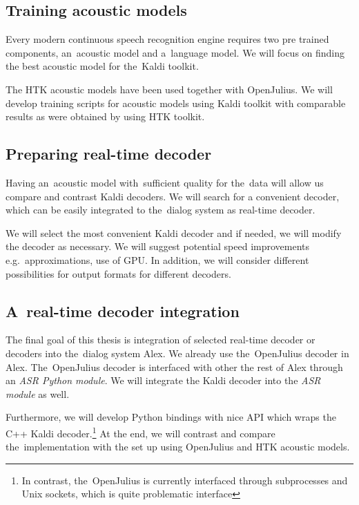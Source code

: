 \subsection{Training acoustic models} 
\label{sub:training_kaldi_acoustic_models}
Every modern continuous speech recognition engine requires two pre trained components, an~acoustic model and 
a~language model. We will focus on finding the best acoustic model for the~Kaldi toolkit. 

The \ac{HTK} acoustic models have been used together with OpenJulius. 
We will develop training scripts for acoustic models using Kaldi toolkit with comparable results as
were obtained by using \ac{HTK} toolkit. 

 

\subsection{Preparing real-time decoder} 
\label{sub:compare_rt}
Having an~acoustic model with~sufficient quality for the~data will allow us
compare and contrast Kaldi decoders. We will search for a convenient decoder,
which can be easily integrated to the~dialog system as real-time decoder.

We will select the most convenient Kaldi decoder and if needed, we will modify the decoder as necessary. 
We will suggest potential speed improvements e.g.\ approximations, use of \ac{GPU}.
In addition, we will consider different possibilities for output formats for different decoders.

\subsection{A~real-time decoder integration} 
\label{sub:integration}
The final goal of this thesis is integration of selected real-time decoder or decoders into the~dialog system Alex.
We already use the~OpenJulius decoder in Alex. The~OpenJulius decoder is interfaced with other the rest of Alex
through an {\it ASR Python module}. We will integrate the Kaldi decoder into the {\it ASR module}\/ as well.

Furthermore, we will develop Python bindings with nice \ac{API} which wraps the C++ Kaldi decoder.\footnote{In contrast, 
the~OpenJulius is currently interfaced through subprocesses and Unix sockets, which is quite problematic interface} 
At the end, we will contrast and compare the~implementation with the set up using OpenJulius and \ac{HTK} 
acoustic models.

